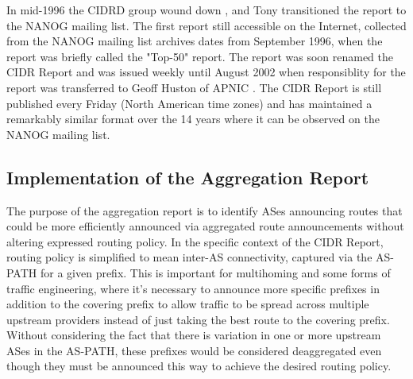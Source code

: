 In mid-1996 the CIDRD group wound down \cite{ftp://ftp.ietf.org/ietf/cidrd/cidrd-minutes-96jun.txt}, and Tony transitioned the report to the NANOG mailing list. The first report still accessible on the Internet, collected from the NANOG mailing list archives \cite{URL...} dates from September 1996, when the report was briefly called the "Top-50" report. The report was soon renamed the CIDR Report and was issued weekly until August 2002 when responsiblity for the report was transferred to Geoff Huston of APNIC \cite{http://www.merit.edu/mail.archives/nanog/2002-08/msg00847.html}. The CIDR Report is still published every Friday (North American time zones) and has maintained a remarkably similar format over the 14 years where it can be observed on the NANOG mailing list.

\subsection{Implementation of the Aggregation Report}

The purpose of the aggregation report is to identify ASes announcing routes that could be more efficiently announced via aggregated route announcements without altering expressed routing policy. In the specific context of the CIDR Report, routing policy is simplified to mean inter-AS connectivity, captured via the AS-PATH for a given prefix. This is important for multihoming and some forms of traffic engineering, where it's necessary to announce more specific prefixes in addition to the covering prefix to allow traffic to be spread across multiple upstream providers instead of just taking the best route to the covering prefix. Without considering the fact that there is variation in one or more upstream ASes in the AS-PATH, these prefixes would be considered deaggregated even though they must be announced this way to achieve the desired routing policy.

